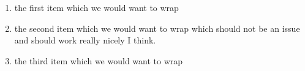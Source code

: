 
\begin{enumerate}
  
  \item the first item which we would want to wrap
  
  \item the second item which we would want
        to wrap which should not be an issue
        and should work really nicely I
        think.
  
  \item the third item which we would want to wrap
  
\end{enumerate}

